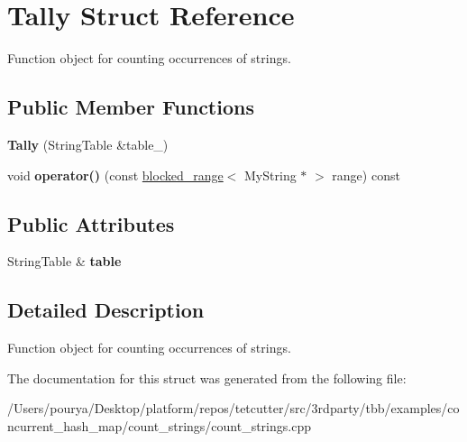 \hypertarget{structTally}{}\section{Tally Struct Reference}
\label{structTally}


Function object for counting occurrences of strings.  


\subsection*{Public Member Functions}
\begin{DoxyCompactItemize}
\item 
\hypertarget{structTally_a2ff54eebf6dba65011c12bfa23a7e5ac}{}{\bfseries Tally} (String\+Table \&table\+\_\+)\label{structTally_a2ff54eebf6dba65011c12bfa23a7e5ac}

\item 
\hypertarget{structTally_a95a07d66bc5aafc837f645a696aaa5e2}{}void {\bfseries operator()} (const \hyperlink{classtbb_1_1blocked__range}{blocked\+\_\+range}$<$ My\+String $\ast$ $>$ range) const \label{structTally_a95a07d66bc5aafc837f645a696aaa5e2}

\end{DoxyCompactItemize}
\subsection*{Public Attributes}
\begin{DoxyCompactItemize}
\item 
\hypertarget{structTally_a47ef36e2937a3caff87eda0bf76caf3b}{}String\+Table \& {\bfseries table}\label{structTally_a47ef36e2937a3caff87eda0bf76caf3b}

\end{DoxyCompactItemize}


\subsection{Detailed Description}
Function object for counting occurrences of strings. 

The documentation for this struct was generated from the following file\+:\begin{DoxyCompactItemize}
\item 
/\+Users/pourya/\+Desktop/platform/repos/tetcutter/src/3rdparty/tbb/examples/concurrent\+\_\+hash\+\_\+map/count\+\_\+strings/count\+\_\+strings.\+cpp\end{DoxyCompactItemize}
